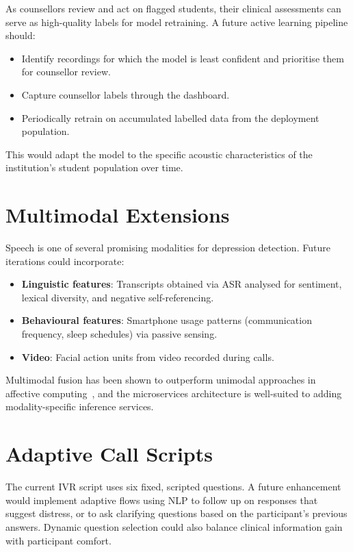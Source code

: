 As counsellors review and act on flagged students, their clinical assessments can serve as high-quality labels for model retraining. A future active learning pipeline should:
\begin{itemize}
    \item Identify recordings for which the model is least confident and prioritise them for counsellor review.
    \item Capture counsellor labels through the dashboard.
    \item Periodically retrain on accumulated labelled data from the deployment population.
\end{itemize}
This would adapt the model to the specific acoustic characteristics of the institution's student population over time.

\section{Multimodal Extensions}

Speech is one of several promising modalities for depression detection. Future iterations could incorporate:
\begin{itemize}
    \item \textbf{Linguistic features}: Transcripts obtained via ASR analysed for sentiment, lexical diversity, and negative self-referencing.
    \item \textbf{Behavioural features}: Smartphone usage patterns (communication frequency, sleep schedules) via passive sensing.
    \item \textbf{Video}: Facial action units from video recorded during calls.
\end{itemize}
Multimodal fusion has been shown to outperform unimodal approaches in affective computing~\cite{Cummins2015}, and the microservices architecture is well-suited to adding modality-specific inference services.

\section{Adaptive Call Scripts}

The current IVR script uses six fixed, scripted questions. A future enhancement would implement adaptive flows using NLP to follow up on responses that suggest distress, or to ask clarifying questions based on the participant's previous answers. Dynamic question selection could also balance clinical information gain with participant comfort.

